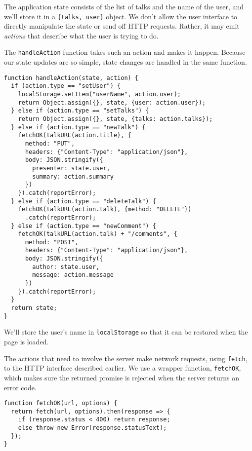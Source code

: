 The application state consists of the list of talks and the name of the user, and we'll store it in a \lstinline`{talks, user}` object. We don't allow the user interface to directly manipulate the state or send off HTTP requests. Rather, it may emit \emph{actions} that describe what the user is trying to do.

The \lstinline`handleAction` function takes such an action and makes it happen. Because our state updates are so simple, state changes are handled in the same function.

\begin{lstlisting}
function handleAction(state, action) {
  if (action.type == "setUser") {
    localStorage.setItem("userName", action.user);
    return Object.assign({}, state, {user: action.user});
  } else if (action.type == "setTalks") {
    return Object.assign({}, state, {talks: action.talks});
  } else if (action.type == "newTalk") {
    fetchOK(talkURL(action.title), {
      method: "PUT",
      headers: {"Content-Type": "application/json"},
      body: JSON.stringify({
        presenter: state.user,
        summary: action.summary
      })
    }).catch(reportError);
  } else if (action.type == "deleteTalk") {
    fetchOK(talkURL(action.talk), {method: "DELETE"})
      .catch(reportError);
  } else if (action.type == "newComment") {
    fetchOK(talkURL(action.talk) + "/comments", {
      method: "POST",
      headers: {"Content-Type": "application/json"},
      body: JSON.stringify({
        author: state.user,
        message: action.message
      })
    }).catch(reportError);
  }
  return state;
}
\end{lstlisting}
\noindent{}

We'll store the user's name in \lstinline`localStorage` so that it can be restored when the page is loaded.

The actions that need to involve the server make network requests, using \lstinline`fetch`, to the HTTP interface described earlier. We use a wrapper function, \lstinline`fetchOK`, which makes sure the returned promise is rejected when the server returns an error code.

\begin{lstlisting}
function fetchOK(url, options) {
  return fetch(url, options).then(response => {
    if (response.status < 400) return response;
    else throw new Error(response.statusText);
  });
}
\end{lstlisting}
\noindent{}

